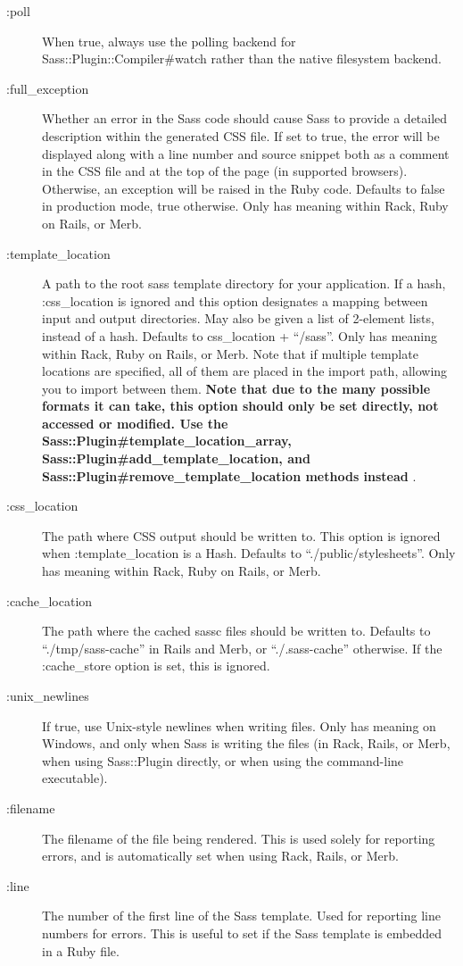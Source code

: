 \documentclass[10pt]{article}
\begin{document}
\begin{description}
\item[:poll]When true, always use the polling backend for Sass::Plugin::Compiler\#watch rather than the native filesystem backend.
\item[:full\_exception]Whether an error in the Sass code should cause Sass to provide a detailed description within the generated CSS file. If set to true, the error will be displayed along with a line number and source snippet both as a comment in the CSS file and at the top of the page (in supported browsers). Otherwise, an exception will be raised in the Ruby code. Defaults to false in production mode, true otherwise. Only has meaning within Rack, Ruby on Rails, or Merb.
\item[:template\_location]A path to the root sass template directory for your application. If a hash, :css\_location is ignored and this option designates a mapping between input and output directories. May also be given a list of 2-element lists, instead of a hash. Defaults to css\_location + ``/sass''. Only has meaning within Rack, Ruby on Rails, or Merb. Note that if multiple template locations are specified, all of them are placed in the import path, allowing you to import between them. \textbf{Note that due to the many possible formats it can take, this option should only be set directly, not accessed or modified. Use the Sass::Plugin\#template\_location\_array, Sass::Plugin\#add\_template\_location, and Sass::Plugin\#remove\_template\_location methods instead}
.
\item[:css\_location]The path where CSS output should be written to. This option is ignored when :template\_location is a Hash. Defaults to ``./public/stylesheets''. Only has meaning within Rack, Ruby on Rails, or Merb.
\item[:cache\_location]The path where the cached sassc files should be written to. Defaults to ``./tmp/sass-cache'' in Rails and Merb, or ``./.sass-cache'' otherwise. If the :cache\_store option is set, this is ignored.
\item[:unix\_newlines]If true, use Unix-style newlines when writing files. Only has meaning on Windows, and only when Sass is writing the files (in Rack, Rails, or Merb, when using Sass::Plugin directly, or when using the command-line executable).
\item[:filename]The filename of the file being rendered. This is used solely for reporting errors, and is automatically set when using Rack, Rails, or Merb.
\item[:line]The number of the first line of the Sass template. Used for reporting line numbers for errors. This is useful to set if the Sass template is embedded in a Ruby file.

\end{description}
\end{document}
